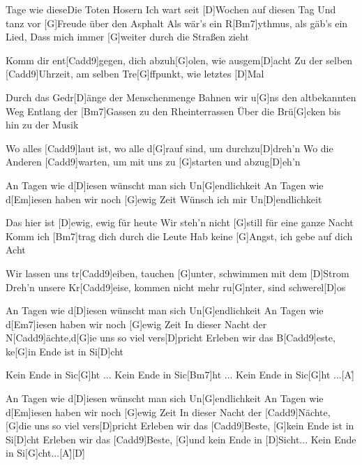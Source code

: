 \documentclass[../main.tex]{subfiles}
\begin{document}
\begin{song}{Tage wie diese}{Die Toten Hosern}{}
Ich wart seit [D]Wochen auf diesen Tag
Und tanz vor [G]Freude über den Asphalt
Als wär's ein R[Bm7]ythmus, als gäb's ein Lied,
Dass mich immer [G]weiter durch die Straßen zieht

Komm dir ent[Cadd9]gegen, dich abzuh[G]olen, wie ausgem[D]acht
Zu der selben [Cadd9]Uhrzeit, am selben Tre[G]ffpunkt, wie letztes [D]Mal

Durch das Gedr[D]{ä}nge der Menschenmenge
Bahnen wir u[G]ns den altbekannten Weg
Entlang der [Bm7]Gassen zu den Rheinterrassen
Über die Brü[G]cken bis hin zu der Musik

Wo alles [Cadd9]laut ist, wo alle d[G]rauf sind, um durchzu[D]dreh'n
Wo die Anderen [Cadd9]warten, um mit uns zu [G]starten und abzug[D]eh'n

An Tagen wie d[D]iesen wünscht man sich Un[G]endlichkeit
An Tagen wie d[Em]iesen haben wir noch [G]ewig Zeit
Wünsch ich mir Un[D]endlichkeit

Das hier ist [D]ewig, ewig für heute
Wir steh'n nicht [G]still für eine ganze Nacht
Komm ich [Bm7]trag dich durch die Leute
Hab keine [G]Angst, ich gebe auf dich Acht

Wir lassen uns tr[Cadd9]eiben, tauchen [G]unter, schwimmen mit dem [D]Strom
Dreh'n unsere Kr[Cadd9]eise, kommen nicht mehr ru[G]nter, sind schwerel[D]os

An Tagen wie d[D]iesen wünscht man sich Un[G]endlichkeit
An Tagen wie d[Em7]iesen haben wir noch [G]ewig Zeit
In dieser Nacht der N[Cadd9]{ä}chte,d[G]ie uns so viel vers[D]pricht
Erleben wir das B[Cadd9]este, ke[G]in Ende ist in Si[D]cht

Kein Ende in Sic[G]ht ...
Kein Ende in Sic[Bm7]ht ...
Kein Ende in Sic[G]ht ...[A]{\h}

An Tagen wie d[D]iesen wünscht man sich Un[G]endlichkeit
An Tagen wie d[Em]iesen haben wir noch [G]ewig Zeit
In dieser Nacht der [Cadd9]Nächte, [G]die uns so viel vers[D]pricht
Erleben wir das [Cadd9]Beste, [G]kein Ende ist in Si[D]cht
Erleben wir das [Cadd9]Beste, [G]und kein Ende in [D]Sicht...
Kein Ende in Si[G]cht...[A]{\h}[D]{\h}
\end{song}
\end{document}
